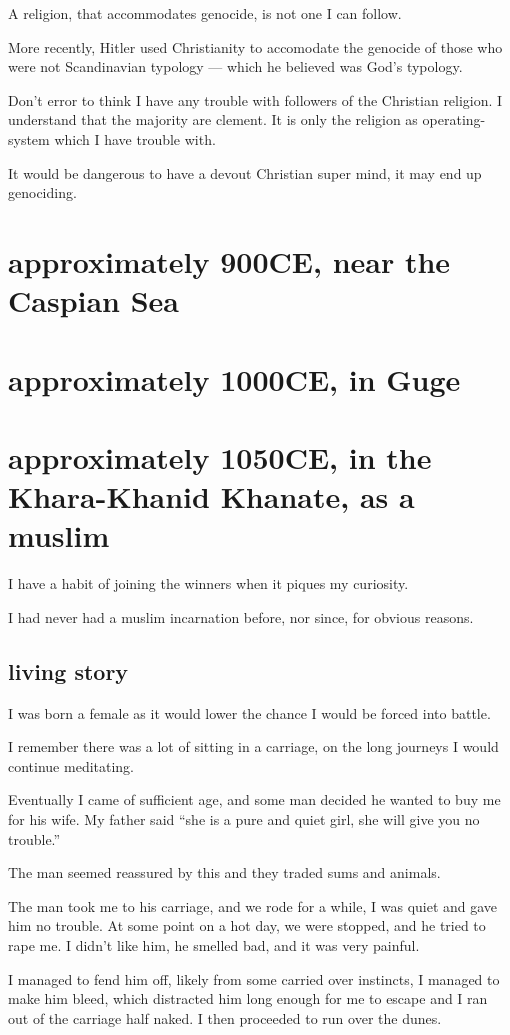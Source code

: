 A religion, that accommodates genocide, is not one I can follow.

More recently, Hitler used Christianity\cite{christianhitler} to accomodate 
the genocide of those who were not Scandinavian typology --- which he believed
was God's typology.

Don't error to think I have any trouble with followers of the Christian
religion. I understand that the majority are clement. It is only the religion as
operating-system which I have trouble with.

It would be dangerous to have a devout Christian super mind,
it may end up genociding.
\chapter{approximately 900CE, near the Caspian Sea}
\chapter{approximately 1000CE, in Guge}
\chapter{approximately 1050CE, in the Khara-Khanid Khanate, as a muslim}\label{reincarnation:muslim}
I have a habit of joining the winners when it piques my curiosity. 

I had never had a muslim incarnation before, nor since, for obvious reasons.

\section{living story}
I was born a female as it would lower the chance I would be forced into battle. 

I remember there was a lot of sitting in a carriage, on the long journeys I 
would continue meditating. 

Eventually I came of sufficient age, and some man decided he wanted to buy me
for his wife. My father said ``she is a pure and quiet girl, she will give you no
trouble.''

The man seemed reassured by this and they traded sums and animals.

The man took me to his carriage, and we rode for a while, I was quiet and gave
him no trouble. At some point on a hot day, we were stopped, and he tried to 
rape me. I didn't like him, he smelled bad, and it was very painful. 

I managed to fend him off, likely from some carried over instincts, I managed to
make him bleed, which distracted him long enough for me to escape and I ran out 
of the carriage half naked. I then proceeded to run over the dunes. 

